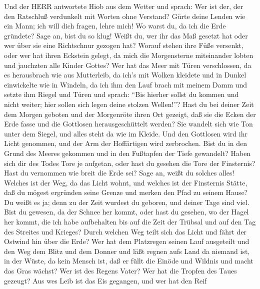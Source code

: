  Und der HERR antwortete Hiob aus dem Wetter und sprach:
 Wer ist der, der den Ratschluß verdunkelt mit Worten ohne
Verstand?  Gürte deine Lenden wie ein Mann; ich will dich
fragen, lehre mich!  Wo warst du, da ich die Erde gründete?
Sage an, bist du so klug!  Weißt du, wer ihr das Maß gesetzt
hat oder wer über sie eine Richtschnur gezogen hat?  Worauf
stehen ihre Füße versenkt, oder wer hat ihren Eckstein gelegt,
 da mich die Morgensterne miteinander lobten und jauchzten
alle Kinder Gottes?  Wer hat das Meer mit Türen
verschlossen, da es herausbrach wie aus Mutterleib,  da
ich's mit Wolken kleidete und in Dunkel einwickelte wie in Windeln,
 da ich ihm den Lauf brach mit meinem Damm und setzte ihm
Riegel und Türen  und sprach: ``Bis hierher sollst du
kommen und nicht weiter; hier sollen sich legen deine stolzen Wellen!''?
 Hast du bei deiner Zeit dem Morgen geboten und der
Morgenröte ihren Ort gezeigt,  daß sie die Ecken der Erde
fasse und die Gottlosen herausgeschüttelt werden?  Sie
wandelt sich wie Ton unter dem Siegel, und alles steht da wie im Kleide.
 Und den Gottlosen wird ihr Licht genommen, und der Arm der
Hoffärtigen wird zerbrochen.  Bist du in den Grund des
Meeres gekommen und in den Fußtapfen der Tiefe gewandelt? 
Haben sich dir des Todes Tore je aufgetan, oder hast du gesehen die Tore
der Finsternis?  Hast du vernommen wie breit die Erde sei?
Sage an, weißt du solches alles!  Welches ist der Weg, da
das Licht wohnt, und welches ist der Finsternis Stätte, 
daß du mögest ergründen seine Grenze und merken den Pfad zu seinem
Hause?  Du weißt es ja; denn zu der Zeit wurdest du
geboren, und deiner Tage sind viel.  Bist du gewesen, da
der Schnee her kommt, oder hast du gesehen, wo der Hagel her kommt,
 die ich habe aufbehalten bis auf die Zeit der Trübsal und
auf den Tag des Streites und Krieges?  Durch welchen Weg
teilt sich das Licht und fährt der Ostwind hin über die Erde?
 Wer hat dem Platzregen seinen Lauf ausgeteilt und den Weg
dem Blitz und dem Donner  und läßt regnen aufs Land da
niemand ist, in der Wüste, da kein Mensch ist,  daß er
füllt die Einöde und Wildnis und macht das Gras wächst? 
Wer ist des Regens Vater? Wer hat die Tropfen des Taues gezeugt?
 Aus wes Leib ist das Eis gegangen, und wer hat den Reif
